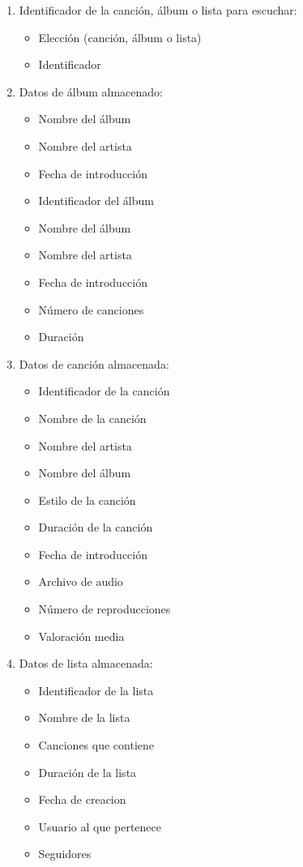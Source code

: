 \documentclass[12pt,a4paper]{article}
\begin{document}
\begin{enumerate}[label=\textnormal{RD\arabic*.}]

	\item Identificador de la canción, álbum o lista para escuchar: \label{rd1}
		\begin{itemize}
			\item Elección (canción, álbum o lista)
			\item Identificador
		\end{itemize}
		
	\item Datos de álbum almacenado: \label{rd2}
		\begin{itemize}
			\item Nombre del álbum
			\item Nombre del artista
			\item Fecha de introducción
			\item Identificador del álbum
        	\item Nombre del álbum
		    \item Nombre del artista
		    \item Fecha de introducción
			\item Número de canciones
			\item Duración
		\end{itemize}
		
		
	\item Datos de canción almacenada: \label{rd3}
		\begin{itemize}
			\item Identificador de la canción
		    \item Nombre de la canción
		    \item Nombre del artista
		    \item Nombre del álbum
		    \item Estilo de la canción
		    \item Duración de la canción
		    \item Fecha de introducción
		    \item Archivo de audio
		    \item Número de reproducciones
		    \item Valoración media
		\end{itemize}
		
	\item Datos de lista almacenada: \label{rd4}
		\begin{itemize}
		    \item Identificador de la lista
		    \item Nombre de la lista
		    \item Canciones que contiene
		    \item Duración de la lista
		    \item Fecha de creacion
		    \item Usuario al que pertenece
		    \item Seguidores
		\end{itemize}
		

\end{enumerate}
\end{document}
